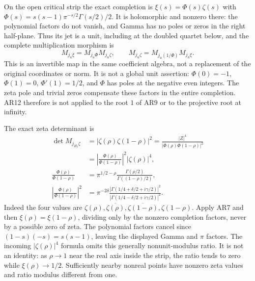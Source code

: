 \documentclass[11pt]{article}
\begin{document}
On the open critical strip the exact completion is
$\xi(s)=\Phi(s)\zeta(s)$ with
$\Phi(s)=s(s-1)\pi^{-s/2}\Gamma(s/2)/2$.
It is holomorphic and nonzero there: the polynomial factors
do not vanish, and Gamma has no poles or zeros in the right
half-plane. Thus its jet is a unit, including at the doubled
quartet below, and the complete multiplication morphism is
\begin{equation}
M_{j_u\xi}=M_{j_u\Phi}M_{j_u\zeta},\qquad
M_{j_u\zeta}=M_{j_u(1/\Phi)}M_{j_u\xi}.
\tag{AR12}
\end{equation}
This is an invertible map in the same coefficient algebra,
not a replacement of the original coordinates or norm.
It is not a global unit assertion: $\Phi(0)=-1$,
$\Phi(1)=0$, $\Phi'(1)=1/2$, and $\Phi$ has poles at the
negative even integers. The zeta pole and trivial zeros
compensate these factors in the entire completion.
AR12 therefore is not applied to the root $1$ of AR9 or to
the projective root at infinity.

The exact zeta determinant is
\begin{align}
\det M_{j_{H_\delta}\zeta}
&=|\zeta(\rho)\zeta(1-\rho)|^2
=\frac{|Z|^4}{|\Phi(\rho)\Phi(1-\rho)|^2}\nonumber\\
&=\left|\frac{\Phi(\rho)}{\Phi(1-\rho)}\right|^2
                         |\zeta(\rho)|^4,\nonumber\\
\frac{\Phi(\rho)}{\Phi(1-\rho)}
&=\pi^{1/2-\rho}\frac{\Gamma(\rho/2)}{\Gamma((1-\rho)/2)},\nonumber\\
\left|\frac{\Phi(\rho)}{\Phi(1-\rho)}\right|^2
&=\pi^{-2\delta}
\frac{|\Gamma(1/4+\delta/2+i\gamma/2)|^2}
     {|\Gamma(1/4-\delta/2+i\gamma/2)|^2}.
\tag{AR13}
\end{align}
Indeed the four values are
$\zeta(\rho),\overline{\zeta(\rho)},
\overline{\zeta(1-\rho)},\zeta(1-\rho)$.
Apply AR7 and then $\xi(\rho)=\xi(1-\rho)$, dividing only
by the nonzero completion factors, never by a possible zero
of zeta. The polynomial factors cancel since
$(1-s)(-s)=s(s-1)$, leaving the displayed Gamma and $\pi$
factors. The incoming $|\zeta(\rho)|^4$ formula omits this
generally nonunit-modulus ratio. It is not an identity:
as $\rho\to1$ near the real axis inside the strip, the ratio
tends to zero while $\xi(\rho)\to1/2$. Sufficiently nearby
nonreal points have nonzero zeta values and ratio modulus
different from one.
\end{document}
